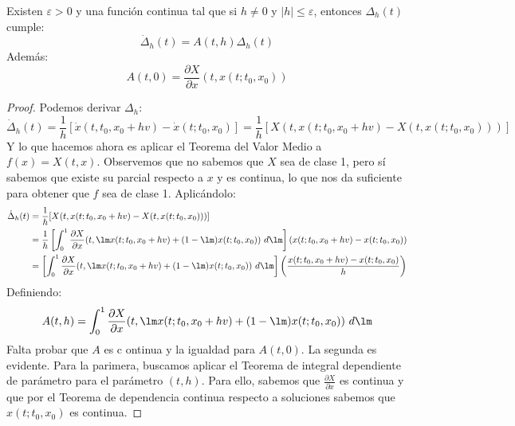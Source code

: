 \begin{lema}\label{lema:1ddir}
    Existen $\varepsilon>0$ y una función continua 
    tal que si $h\neq 0$ y $|h|\leq \varepsilon$, entonces $\Delta_h(t)$ cumple:
    \begin{equation*}
        \dot{\Delta}_h(t) = A(t,h)\Delta_h(t)
    \end{equation*}
    Además:
    \begin{equation*}
        A(t,0) = \frac{\partial X}{\partial x}(t,x(t;t_0,x_0))
    \end{equation*}
    \begin{proof}
        Podemos derivar $\Delta_h$:
        \begin{equation*}
            \dot{\Delta}_h(t) = \frac{1}{h}[\dot{x}(t,t_0,x_0+hv)-\dot{x}(t;t_0,x_0)] = \frac{1}{h}[X(t,x(t;t_0,x_0+hv) - X(t,x(t;t_0,x_0)))]
        \end{equation*}
        Y lo que hacemos ahora es aplicar el Teorema del Valor Medio a $f(x) = X(t,x)$. Observemos que no sabemos que $X$ sea de clase 1, pero sí sabemos que existe su parcial respecto a $x$ y es continua, lo que nos da suficiente para obtener que $f$ sea de clase 1. Aplicándolo:
        \begin{align*}
            \dot{\Delta}_h(t) &= \frac{1}{h}[X(t,x(t;t_0,x_0+hv) - X(t,x(t;t_0,x_0)))] \\
                              &= \frac{1}{h}\left[\int_{0}^{1} \frac{\partial X}{\partial x}(t,\lm x(t;t_0,x_0+hv)+(1-\lm)x(t;t_0,x_0))~d\lm \right](x(t;t_0,x_0+hv)-x(t;t_0,x_0)) \\
                              &= \left[\int_{0}^{1} \frac{\partial X}{\partial x}(t,\lm x(t;t_0,x_0+hv)+(1-\lm)x(t;t_0,x_0))~d\lm \right]\left(\frac{x(t;t_0,x_0+hv)-x(t;t_0,x_0)}{h}\right)
        \end{align*}
        Definiendo:
        \begin{equation*}
            A(t,h) = \int_{0}^{1} \frac{\partial X}{\partial x}(t,\lm x(t;t_0,x_0+hv) + (1-\lm)x(t;t_0,x_0))~d\lm 
        \end{equation*}
        Falta probar que $A$ es c ontinua y la igualdad para $A(t,0)$. La segunda es evidente. Para la parimera, buscamos aplicar el Teorema de integral dependiente de parámetro para el parámetro $(t,h)$. Para ello, sabemos que $\frac{\partial X}{\partial x}$ es continua y que por el Teorema de dependencia continua respecto a soluciones sabemos que $x(t;t_0,x_0)$ es continua.
    \end{proof}
\end{lema}

